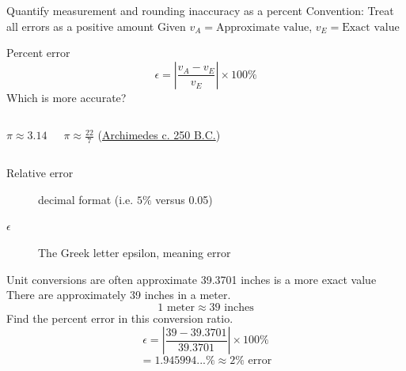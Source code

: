 \begin{frame}{Quantify measurement and rounding inaccuracy as a percent}
    {Convention: Treat all errors as a positive amount}
    Given $v_A= \text{Approximate value}$, $v_E= \text{Exact value}$ \par \bigskip
    Percent error
    $$\epsilon = \left|\frac{v_A-v_E}{v_E}\right| \times 100\%$$
    \bigskip    
    Which is more accurate? %
        \begin{columns}
                $\pi \approx 3.14$ \par \bigskip
                $\pi \approx \frac{22}{7}$ (\href{https://en.wikipedia.org/wiki/Archimedes}{Archimedes c. 250 B.C.}) \par \medskip
        \end{columns}  \vspace{0.5cm}
        \begin{description}
            \item[Relative error] decimal format (i.e. $5\%$ versus 0.05)
            \item[$\epsilon$] The Greek letter epsilon, meaning error
        \end{description}
    \end{frame}
    
\begin{frame}{Unit conversions are often approximate}
    {39.3701 inches is a more exact value}
    There are approximately 39 inches in a meter.
    $$ 1 \text{ meter} \approx 39 \text{ inches}$$
    Find the percent error in this conversion ratio. \vspace{1cm}
    $$\epsilon = \left|\frac{39-39.3701}{39.3701}\right| \times 100\%$$
    $$=1.945994...\% \approx 2\% \text{ error}$$
    \end{frame}

